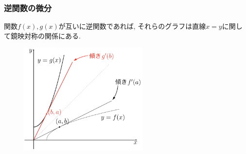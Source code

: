 \documentclass[dvipdfmx,cjk,10.2pt]{beamer}
\newcommand{\R}{\mathbb{R}}
\theoremstyle{definition}
\newtheorem{Prob}[Thm]{問題}
\begin{document}


\begin{frame}
\frametitle{逆関数の微分}


関数$f(x),g(x)$が互いに逆関数であれば, それらのグラフは直線$x=y$に関して鏡映対称の関係にある. 


 \begin{figure}[htbp]
 \begin{center} 
  \includegraphics[width=65mm]{diff_inv.png}
 \end{center}
\end{figure}



\end{frame}





%
%
\end{document}
